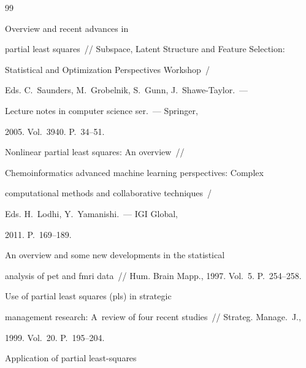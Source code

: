 {\small\frenchspacing

{%


\begin{thebibliography}{99}


 Overview and recent advances in 

partial least squares~/\!\!/ Subspace, Latent Structure and Feature Selection: 

 Statistical and Optimization Perspectives Workshop~/

  Eds. C.~Saunders, M.~Grobelnik, S.~Gunn, J.~Shawe-Taylor.~--- 

 Lecture notes in computer science ser.~--- Springer, 

2005. Vol.~3940. P.~34--51.




 Nonlinear partial least squares: An overview~/\!\!/ 

Chemoinformatics advanced machine learning perspectives: Complex 

computational methods and collaborative techniques~/

Eds. H.~Lodhi, Y.~Yamanishi.~--- IGI Global, 

2011. P.~169--189.








 An overview and some new developments in the statistical 

analysis of pet and fmri data~/\!\!/ Hum. Brain Mapp., 1997. Vol.~5. P.~254--258.




 Use of partial least squares (pls) in strategic 

management research: A~review of four recent studies~/\!\!/ Strateg. Manage.~J., 

1999. Vol.~20. P.~195--204.




 Application of partial least-squares 


\end{thebibliography}}}

